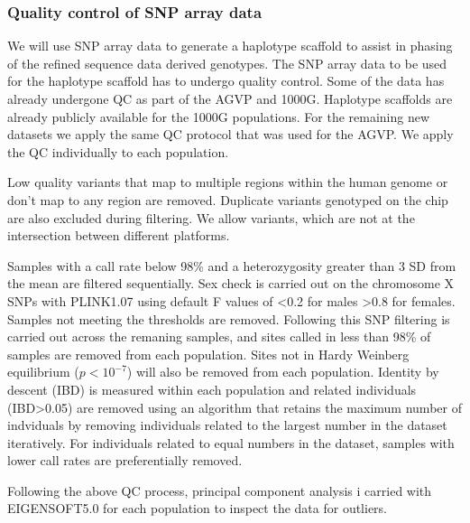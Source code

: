 \subsubsection{Quality control of SNP array data}
\label{sec:QCchip}
We will use SNP array data to generate a haplotype scaffold to assist in phasing of the refined sequence data derived genotypes. The SNP array data to be used for the haplotype scaffold has to undergo quality control. Some of the data has already undergone QC as part of the AGVP\cite{Gurdasani2015} and 1000G\cite{1000G2012}. Haplotype scaffolds are already publicly available for the 1000G populations. For the remaining new datasets we apply the same QC protocol that was used for the AGVP. We apply the QC individually to each population.

Low quality variants that map to multiple regions within the human genome or don't map to any region are removed. Duplicate variants genotyped on the chip are also excluded during filtering. We allow variants, which are not at the intersection between different platforms.

Samples with a call rate below 98\% and a heterozygosity greater than 3 SD from the mean are filtered sequentially. Sex check is carried out on the chromosome X SNPs with PLINK1.07 using default F values of \textless0.2 for males \textgreater0.8 for females. Samples not meeting the thresholds are removed. Following this SNP filtering is carried out across the remaning samples, and sites called in less than 98\% of samples are removed from each population. Sites not in Hardy Weinberg equilibrium ($p<10^{-7}$) will also be removed from each population. Identity by descent (IBD) is measured within each population and related individuals (IBD\textgreater0.05) are removed using an algorithm that retains the maximum number of indviduals by removing individuals related to the largest number in the dataset iteratively. For individuals related to equal numbers in the dataset, samples with lower call rates are preferentially removed.

Following the above QC process, principal component analysis i carried with EIGENSOFT5.0 for each population to inspect the data for outliers.